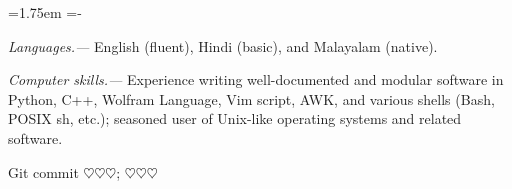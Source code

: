 \documentclass[10pt,article,oneside]{memoir}
\def\hangpars{%
  \leftskip=1.75em%
  \parindent=-\leftskip%
  \setsecindent{-\leftskip}%
  \setsubsecindent{-\leftskip}%
}
\def\gitError{$\heartsuit\heartsuit\heartsuit$}
\def\gitHash{\gitError}
\def\gitShortHash{\gitError}
\def\gitCommitterDate{\gitError}
\begin{document}
\hangpars

\emph{Languages.---} English (fluent), Hindi (basic), and Malayalam (native).

\emph{Computer skills.---} Experience writing well-documented and modular software in Python, C++, Wolfram Language, Vim script, AWK, and various shells (Bash, POSIX sh, etc.); seasoned user of Unix-like operating systems and related software.


\bigskip

\begin{center}
  \color{gray}
  Git commit \href{https://github.com/manu-mannattil/vitae/tree/\gitHash}{\texttt{\gitShortHash}}; \gitCommitterDate
\end{center}
\end{document}
